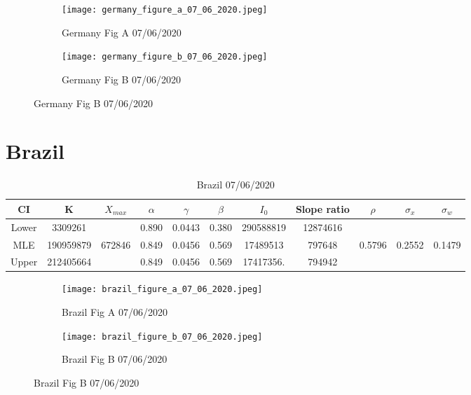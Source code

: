 \documentclass{article}
\begin{document}
\begin{figure}[htb]
\centering
    \begin{subfigure}{0.5\textwidth}
        \texttt{[image: germany\_figure\_a\_07\_06\_2020.jpeg]}
        \caption{Germany Fig A 07/06/2020}
        \label{fig:germany_figure_a_07_06_2020}
    \end{subfigure}%
        \begin{subfigure}{0.5\textwidth}                                   \texttt{[image: germany\_figure\_b\_07\_06\_2020.jpeg]}
        \caption{Germany Fig B 07/06/2020}
        \label{fig:germany_figure_b_07_06_2020}
    \end{subfigure}
\end{figure}

\section{Brazil}

\begin{table}[ht]
    \centering
\begin{tabular}{|c|c|c|c|c|c|c|c|c|c|c|}
     \hline
     CI & K & $X_{max}$ & $\alpha$ & $\gamma$ & $\beta$ & $I_0$ & Slope ratio  & $\rho$ & $\sigma_x$ & $\sigma_w$\\
     \hline
     \hline
Lower &  3309261 &  &0.890 &0.0443 &0.380& 290588819&  12874616 & & &  \\
     \hline
MLE  & 190959879 & 672846 &0.849 &0.0456 &0.569&  17489513&   797648  & 0.5796 & 0.2552&  0.1479  \\
     \hline
Upper & 212405664&  &0.849 &0.0456 &0.569&  17417356.&   794942 & & &  \\
\hline
\end{tabular}
    \caption{Brazil 07/06/2020}
\end{table}

\begin{figure}[htb]
\centering
    \begin{subfigure}{0.5\textwidth}
        \texttt{[image: brazil\_figure\_a\_07\_06\_2020.jpeg]}
        \caption{Brazil Fig A 07/06/2020}
        \label{fig:brazil_figure_a_07_06_2020}
    \end{subfigure}%
        \begin{subfigure}{0.5\textwidth}                                   \texttt{[image: brazil\_figure\_b\_07\_06\_2020.jpeg]}
        \caption{Brazil Fig B 07/06/2020}
        \label{fig:brazil_figure_b_07_06_2020}
    \end{subfigure}
\end{figure}
\end{document}
